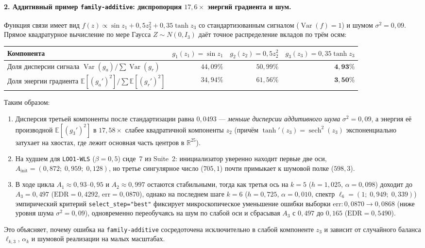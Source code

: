 \documentclass[11pt,a4paper]{article}
\numberwithin{equation}{section}
\theoremstyle{definition}
\theoremstyle{remark}
\newcommand{\R}{\mathbb{R}}
\newcommand{\E}{\mathbb{E}}
\newcommand{\Var}{\operatorname{Var}}
\begin{document}
\paragraph{2. Аддитивный пример \texttt{family-additive}: диспропорция $17{,}6\times$ энергий градиента и шум.}
Функция связи имеет вид $f(z) \propto \sin z_1 + 0{,}5 z_2^2 + 0{,}35\tanh z_3$ со стандартизованным сигналом ($\Var(f)=1$)
и шумом $\sigma^2 = 0{,}09$. Прямое квадратурное вычисление по мере Гаусса $Z \sim N(0, I_3)$ даёт точное распределение
вкладов по трём осям:
\begin{center}
\small
\begin{tabular}{@{}lrrr@{}}
\toprule
Компонента & $g_1(z_1) = \sin z_1$ & $g_2(z_2) = 0{,}5 z_2^2$ & $g_3(z_3) = 0{,}35\tanh z_3$ \\
\midrule
Доля дисперсии сигнала $\Var(g_a)/\sum \Var(g_r)$ & $44{,}09\%$ & $50{,}99\%$ & $\mathbf{4{,}93\%}$ \\
Доля энергии градиента $\E[(g_a')^2]/\sum \E[(g_r')^2]$ & $34{,}94\%$ & $61{,}56\%$ & $\mathbf{3{,}50\%}$ \\
\bottomrule
\end{tabular}
\end{center}
Таким образом:
\begin{enumerate}
  \item Дисперсия третьей компоненты после стандартизации равна $0{,}0493$ — \emph{меньше дисперсии аддитивного шума}
  $\sigma^2 = 0{,}09$, а энергия её производной $\E[(g_3')^2]$ в $17{,}58\times$ слабее квадратичной компоненты $z_2$
  (причём $\tanh'(z_3) = \operatorname{sech}^2(z_3)$ экспоненциально затухает на хвостах, где лежит основная часть центров в $\R^{25}$).
  \item На худшем для \texttt{LOO1-WLS} ($\beta=0{,}5$) сиде~7 из Suite~2:
  инициализатор уверенно находит первые две оси, $A_{\mathrm{init}} = (0{,}872;\; 0{,}959;\; 0{,}128)$,
  но третье сингулярное число ($705{,}1$) почти примыкает к шумовой полке ($598{,}3$).
  \item В ходе цикла $A_1 \approx 0{,}93\text{--}0{,}95$ и $A_2 \approx 0{,}997$ остаются стабильными,
  тогда как третья ось на $k = 5$ ($h = 1{,}025$, $\alpha = 0{,}098$) доходит до $A_3 = 0{,}497$
  ($\mathrm{EDR} = 0{,}4292$, $\mathrm{err} = 0{,}0870$), однако на последнем шаге $k = 6$ ($h = 0{,}725$, $\alpha = 0{,}010$,
  спектр $\ell_6 = (1;\; 0{,}949;\; 0{,}339)$) эмпирический критерий \texttt{select\_step="best"} фиксирует
  микроскопическое уменьшение ошибки выборки $\mathrm{err}: 0{,}0870 \to 0{,}0868$ (ниже уровня шума $\sigma^2 = 0{,}09$),
  одновременно переобучаясь на шум по слабой оси и сбрасывая $A_3$ с $0{,}497$ до $0{,}165$ ($\mathrm{EDR} = 0{,}5490$).
\end{enumerate}
Это объясняет, почему ошибка на \texttt{family-additive} сосредоточена исключительно в слабой компоненте $z_3$
и зависит от случайного баланса $\ell_{k,3}$, $\alpha_k$ и шумовой реализации на малых масштабах.
\end{document}
